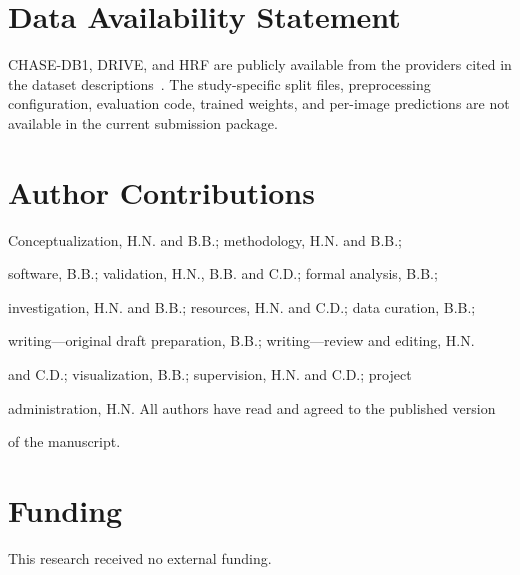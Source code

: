 \documentclass[jimaging,article,submit,pdftex,moreauthors]{Definitions/mdpi}%
\providecommand{\dataavailability}[1]{\section*{Data Availability Statement}#1}
\providecommand{\authorcontributions}[1]{\section*{Author Contributions}#1}
\providecommand{\funding}[1]{\section*{Funding}#1}
\begin{document}






\dataavailability{CHASE-DB1, DRIVE, and HRF are publicly available from the providers cited in the dataset descriptions~\cite{CHASEDB1,Staal2004,Odstrcilik2013HRF}. The study-specific split files, preprocessing configuration, evaluation code, trained weights, and per-image predictions are not available in the current submission package.}





\authorcontributions{Conceptualization, H.N. and B.B.; methodology, H.N. and B.B.;

software, B.B.; validation, H.N., B.B. and C.D.; formal analysis, B.B.;

investigation, H.N. and B.B.; resources, H.N. and C.D.; data curation, B.B.;

writing---original draft preparation, B.B.; writing---review and editing, H.N.

and C.D.; visualization, B.B.; supervision, H.N. and C.D.; project

administration, H.N. All authors have read and agreed to the published version

of the manuscript.}





\funding{This research received no external funding.}



\end{document}
